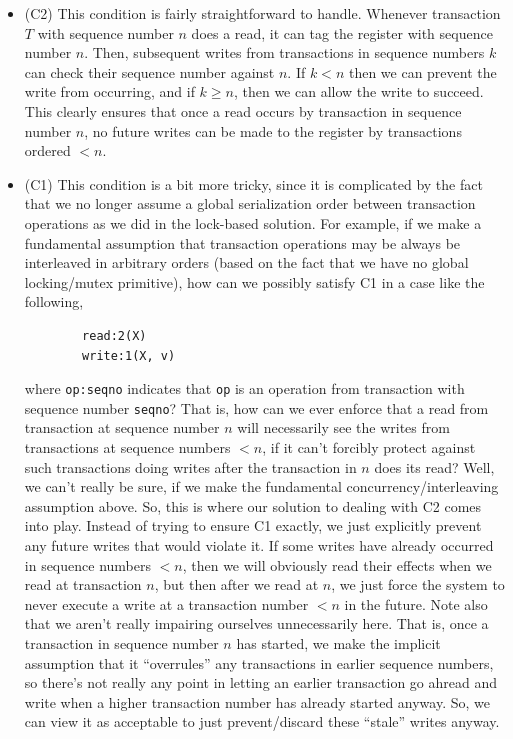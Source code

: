 \documentclass[10pt,a4paper]{article}
\begin{document}
\begin{itemize}
    \item (C2) This condition is fairly straightforward to handle. Whenever transaction $T$ with sequence number $n$ does a read, it can tag the register with sequence number $n$. Then, subsequent writes from transactions in sequence numbers $k$ can check their sequence number against $n$. If $k < n$ then we can prevent the write from occurring, and if $k  \geq n$, then we can allow the write to succeed. This clearly ensures that once a read occurs by transaction in sequence number $n$, no future writes can be made to the register by transactions ordered $ < n$.
    \item (C1) This condition is a bit more tricky, since it is complicated by the fact that we no longer assume a global serialization order between transaction operations as we did in the lock-based solution. For example, if we make a fundamental assumption that transaction operations may be always be interleaved in arbitrary orders (based on the fact that we have no global locking/mutex primitive), how can we possibly satisfy C1 in a case like the following,
    \begin{verbatim}
        read:2(X)
        write:1(X, v)
    \end{verbatim}
    where \verb|op:seqno| indicates that \verb|op| is an operation from transaction with sequence number \verb|seqno|? That is, how can we ever enforce that a read from transaction at sequence number $n$ will necessarily see the writes from transactions at sequence numbers $< n$, if it can't forcibly protect against such transactions doing writes after the transaction in $n$ does its read? Well, we can't really be sure, if we make the fundamental concurrency/interleaving assumption above. So, this is where our solution to dealing with C2 comes into play. Instead of trying to ensure C1 exactly, we just explicitly prevent any future writes that would violate it. If some writes have already occurred in sequence numbers $< n$, then we will obviously read their effects when we read at transaction $n$, but then after we read at $n$, we just force the system to never execute a write at a transaction number $< n$ in the future. Note also that we aren't really impairing ourselves unnecessarily here. That is, once a transaction in sequence number $n$ has started, we make the implicit assumption that it ``overrules'' any transactions in earlier sequence numbers, so there's not really any point in letting an earlier transaction go ahread and write when a higher transaction number has already started anyway. So, we can view it as acceptable to just prevent/discard these ``stale'' writes anyway.
\end{itemize}
\end{document}
